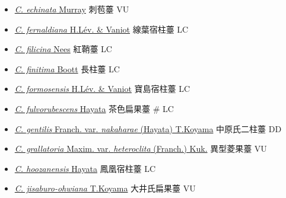 \begin{itemize}
\begin{itemize}
        \item[] \href{http://www.theplantlist.org/tpl1.1/search?q=Carex+echinata}{\textit{C. echinata} Murray}   刺苞薹   VU
        \item[] \href{http://www.theplantlist.org/tpl1.1/search?q=Carex+fernaldiana}{\textit{C. fernaldiana} H.Lév. \& Vaniot}   線葉宿柱薹   LC
        \item[] \href{http://www.theplantlist.org/tpl1.1/search?q=Carex+filicina}{\textit{C. filicina} Nees}   紅鞘薹   LC
        \item[] \href{http://www.theplantlist.org/tpl1.1/search?q=Carex+finitima}{\textit{C. finitima} Boott}   長柱薹   LC
        \item[] \href{http://www.theplantlist.org/tpl1.1/search?q=Carex+formosensis}{\textit{C. formosensis} H.Lév. \& Vaniot}   寶島宿柱薹   LC
        \item[] \href{http://www.theplantlist.org/tpl1.1/search?q=Carex+fulvorubescens}{\textit{C. fulvorubescens} Hayata}   茶色扁果薹  \# LC
        \item[] \href{http://www.theplantlist.org/tpl1.1/search?q=Carex+gentilis+var.+nakaharae}{\textit{C. gentilis} Franch. var. \textit{nakaharae} (Hayata) T.Koyama}   中原氏二柱薹   DD
        \item[] \href{http://www.theplantlist.org/tpl1.1/search?q=Carex+grallatoria+var.+heteroclita}{\textit{C. grallatoria} Maxim. var. \textit{heteroclita} (Franch.) Kuk.}   異型菱果薹   VU
        \item[] \href{http://www.theplantlist.org/tpl1.1/search?q=Carex+hoozanensis}{\textit{C. hoozanensis} Hayata}   鳳凰宿柱薹   LC
        \item[] \href{http://www.theplantlist.org/tpl1.1/search?q=Carex+jisaburo-ohwiana}{\textit{C. jisaburo-ohwiana} T.Koyama}   大井氏扁果薹   VU

\end{itemize}
\end{itemize}
